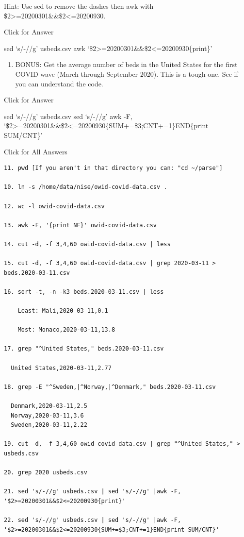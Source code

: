 \documentclass[
]{book}
\providecommand{\tightlist}{%
  \setlength{\itemsep}{0pt}\setlength{\parskip}{0pt}}
\begin{document}
Hint: Use sed to remove the dashes then awk with \$2\textgreater=20200301\&\&\$2\textless=20200930.

Click for Answer

sed `s/-//g' usbeds.csv \textbar{} awk `\$2\textgreater=20200301\&\&\$2\textless=20200930\{print\}'

\hfill\break

\begin{enumerate}
\def\labelenumi{\arabic{enumi}.}
\setcounter{enumi}{21}
\tightlist
\item
  BONUS: Get the average number of beds in the United States for the first COVID wave (March through September 2020). This is a tough one. See if you can understand the code.
\end{enumerate}

Click for Answer

sed `s/-//g' usbeds.csv \textbar{} sed `s/-//g' \textbar awk -F, `\$2\textgreater=20200301\&\&\$2\textless=20200930\{SUM+=\$3;CNT+=1\}END\{print SUM/CNT\}'

\hfill\break

Click for All Answers

\begin{verbatim}
11. pwd [If you aren't in that directory you can: "cd ~/parse"]

10. ln -s /home/data/nise/owid-covid-data.csv . 

12. wc -l owid-covid-data.csv

13. awk -F, '{print NF}' owid-covid-data.csv

14. cut -d, -f 3,4,60 owid-covid-data.csv | less

15. cut -d, -f 3,4,60 owid-covid-data.csv | grep 2020-03-11 > beds.2020-03-11.csv

16. sort -t, -n -k3 beds.2020-03-11.csv | less

    Least: Mali,2020-03-11,0.1
    
    Most: Monaco,2020-03-11,13.8

17. grep "^United States," beds.2020-03-11.csv

  United States,2020-03-11,2.77

18. grep -E "^Sweden,|^Norway,|^Denmark," beds.2020-03-11.csv

  Denmark,2020-03-11,2.5
  Norway,2020-03-11,3.6
  Sweden,2020-03-11,2.22

19. cut -d, -f 3,4,60 owid-covid-data.csv | grep "^United States," > usbeds.csv

20. grep 2020 usbeds.csv

21. sed 's/-//g' usbeds.csv | sed 's/-//g' |awk -F, '$2>=20200301&&$2<=20200930{print}'

22. sed 's/-//g' usbeds.csv | sed 's/-//g' |awk -F, '$2>=20200301&&$2<=20200930{SUM+=$3;CNT+=1}END{print SUM/CNT}'

\end{verbatim}
\end{document}
